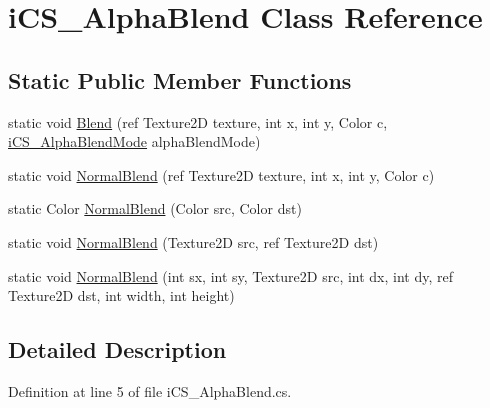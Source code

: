 \hypertarget{classi_c_s___alpha_blend}{\section{i\+C\+S\+\_\+\+Alpha\+Blend Class Reference}
\label{classi_c_s___alpha_blend}
}
\subsection*{Static Public Member Functions}
\begin{DoxyCompactItemize}
\item 
static void \hyperlink{classi_c_s___alpha_blend_af98efadd431e7effa32674b2db2c5cc6}{Blend} (ref Texture2\+D texture, int x, int y, Color c, \hyperlink{i_c_s___alpha_blend_8cs_a5e9588ae9020b1b87d273534f4fed9c1}{i\+C\+S\+\_\+\+Alpha\+Blend\+Mode} alpha\+Blend\+Mode)
\item 
static void \hyperlink{classi_c_s___alpha_blend_a74f8deba9e6fe2ae2fc7333ff4c05a5e}{Normal\+Blend} (ref Texture2\+D texture, int x, int y, Color c)
\item 
static Color \hyperlink{classi_c_s___alpha_blend_a93ee6292b61eb8f5cb0607300dd68534}{Normal\+Blend} (Color src, Color dst)
\item 
static void \hyperlink{classi_c_s___alpha_blend_a55ff966658166335a6008a7f833a664f}{Normal\+Blend} (Texture2\+D src, ref Texture2\+D dst)
\item 
static void \hyperlink{classi_c_s___alpha_blend_a382b16214b209986dfef43914bad2fef}{Normal\+Blend} (int sx, int sy, Texture2\+D src, int dx, int dy, ref Texture2\+D dst, int width, int height)
\end{DoxyCompactItemize}


\subsection{Detailed Description}


Definition at line 5 of file i\+C\+S\+\_\+\+Alpha\+Blend.\+cs.



